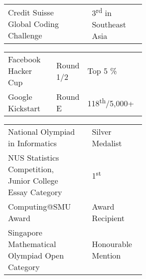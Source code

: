 \documentclass[a4paper,hidelinks]{resume} %
\begin{document}
\begin{minipage}[t]{0.49\textwidth}
    \sectionspace %
    
    
    \begin{tabular}{p{0.55\linewidth} p{0\linewidth} l}
        {Credit Suisse Global Coding \linebreak Challenge} & & 3\textsuperscript{rd} in Southeast Asia \\
    \end{tabular}
    \begin{tabular}{p{0.35\linewidth} p{0.20\linewidth} l}
        Facebook Hacker Cup & Round 1/2 & Top 5 \% \\
        Google Kickstart & Round E & 118\textsuperscript{th}/5,000+ \\
    \end{tabular}
    
    \sectionspace %
    
    
    \begin{tabular}{p{0.55\linewidth} p{0\linewidth} l}
        National Olympiad in Informatics & & Silver Medalist \\
        NUS Statistics Competition, Junior College Essay Category & & 1\textsuperscript{st} \\
        Computing@SMU Award & & Award Recipient\\
        Singapore Mathematical Olympiad Open Category & & Honourable Mention\\
    \end{tabular}
    
    \sectionspace %


\end{minipage} %
\hfill
%
%
\end{document}
